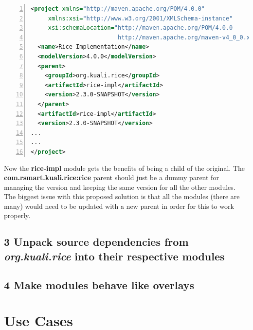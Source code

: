 \documentclass[12pt,notitlepage]{article}
\begin{document}
\newpage 
\begin{lstlisting}[numbers=left,language=xml,basicstyle=\scriptsize,backgroundcolor=\color{ubergray},caption={Custom Impl Module Alternative Parent Definition},frame=single,breaklines=true]
<project xmlns="http://maven.apache.org/POM/4.0.0" 
     xmlns:xsi="http://www.w3.org/2001/XMLSchema-instance" 
     xsi:schemaLocation="http://maven.apache.org/POM/4.0.0 
                         http://maven.apache.org/maven-v4_0_0.xsd">
  <name>Rice Implementation</name>
  <modelVersion>4.0.0</modelVersion>
  <parent>
    <groupId>org.kuali.rice</groupId>
    <artifactId>rice-impl</artifactId>
    <version>2.3.0-SNAPSHOT</version>
  </parent>
  <artifactId>rice-impl</artifactId>
  <version>2.3.0-SNAPSHOT</version>
...
...
</project>
  \end{lstlisting}

Now the \textbf{rice-impl} module gets the benefits of being a child of the original. The \textbf{com.rsmart.kuali.rice:rice} parent should just be a dummy parent for managing the version and keeping the same version for all the other modules. The biggest issue with this proposed solution is that all the modules (there are many) would need to be updated with a new parent in order for this to work properly.

\subsection*{3 Unpack source dependencies from \emph{org.kuali.rice} into their respective modules}

\subsection*{4 Make modules behave like overlays}

\section{Use Cases}

\subsubsection{}

\newpage
\listoffigures
\lstlistoflistings
\end{document}
